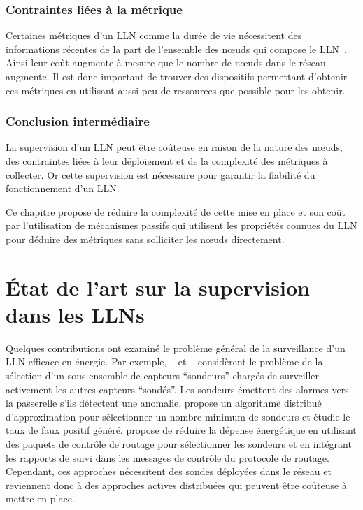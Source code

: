 \subsubsection{Contraintes liées à la métrique}

Certaines métriques d'un \ac{LLN} comme la durée de vie nécessitent des informations récentes de la part de l'ensemble des nœuds qui compose le \ac{LLN}~\cite{chen2005lifetime}.
Ainsi leur coût augmente à mesure que le nombre de nœuds dans le réseau augmente.
Il est donc important de trouver des dispositifs permettant d'obtenir ces métriques en utilisant aussi peu de ressources que possible pour les obtenir.

\subsubsection*{Conclusion intermédiaire}

La supervision d'un \ac{LLN} peut être coûteuse en raison de la nature des nœuds, des contraintes liées à leur déploiement et de la complexité des métriques à collecter.
Or cette supervision est nécessaire pour garantir la fiabilité du fonctionnement d'un \ac{LLN}.

Ce chapitre propose de réduire la complexité de cette mise en place et son coût par l'utilisation de mécanismes passifs qui utilisent les propriétés connues du \ac{LLN} pour déduire des métriques sans solliciter les nœuds directement.

\section{État de l'art sur la supervision dans les \ac{LLN}s}
\label{supervision:related}

Quelques contributions ont examiné le problème général de la surveillance d'un \ac{LLN} efficace en énergie.
Par exemple, ~\cite{Liu:2010dz} et ~\cite{Lahmadi:2013tw} considèrent le problème de la sélection d'un sous-ensemble de capteurs ``sondeurs'' chargés de surveiller activement les autres capteurs ``sondés''.
Les sondeurs émettent des alarmes vers la passerelle s'ils détectent une anomalie.
\cite{Liu:2010dz} propose un algorithme distribué d'approximation pour sélectionner un nombre minimum de sondeurs et étudie le taux de faux positif généré.
\cite{Lahmadi:2013tw} propose de réduire la dépense énergétique en utilisant des paquets de contrôle de routage pour sélectionner les sondeurs et en intégrant les rapports de suivi dans les messages de contrôle du protocole de routage.
Cependant, ces approches nécessitent des sondes déployées dans le réseau et reviennent donc à des approches actives distribuées qui peuvent être coûteuse à mettre en place.

